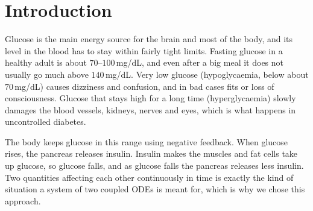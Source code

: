 \documentclass[11pt,a4paper]{article}
\newcommand{\cs}{c^{*}}
\begin{document}
\begin{abstract}
\noindent
After a meal, blood glucose goes up sharply, but in a healthy person it comes back to around $90$\,mg/dL within an hour or two. This happens because of a feedback loop between glucose and insulin. In this project we model that loop with two coupled ODEs, one for glucose $G(t)$ and one for insulin $I(t)$, and treat the meal as an impulse added to the glucose equation. We find the fasting equilibrium, linearise the system around it and get the characteristic equation $\lambda^2+(\alpha+d)\lambda+(\alpha d+\beta c)=0$. The equilibrium turns out to be stable for any insulin production rate $c$. What $c$ changes is the way glucose comes back. Below the critical value $\cs=(\alpha-d)^2/4\beta\approx0.0119$ the eigenvalues are real and glucose decays straight back (a stable node). Above it the eigenvalues are complex and glucose overshoots and oscillates a little before settling (a stable spiral). We solved the model with our own RK4 code and checked it against SciPy. The simulations and phase-plane plots agree with the eigenvalue analysis. Finally we set the insulin production to zero to model Type-1 diabetes. In that case glucose no longer returns to $90$\,mg/dL and instead rises to a new equilibrium at $360$\,mg/dL.
\end{abstract}

\tableofcontents
\newpage

\section{Introduction}

Glucose is the main energy source for the brain and most of the body, and its level in the blood has to stay within fairly tight limits. Fasting glucose in a healthy adult is about $70$--$100$\,mg/dL, and even after a big meal it does not usually go much above $140$\,mg/dL. Very low glucose (hypoglycaemia, below about $70$\,mg/dL) causes dizziness and confusion, and in bad cases fits or loss of consciousness. Glucose that stays high for a long time (hyperglycaemia) slowly damages the blood vessels, kidneys, nerves and eyes, which is what happens in uncontrolled diabetes.

The body keeps glucose in this range using negative feedback. When glucose rises, the pancreas releases insulin. Insulin makes the muscles and fat cells take up glucose, so glucose falls, and as glucose falls the pancreas releases less insulin. Two quantities affecting each other continuously in time is exactly the kind of situation a system of two coupled ODEs is meant for, which is why we chose this approach.
\end{document}
